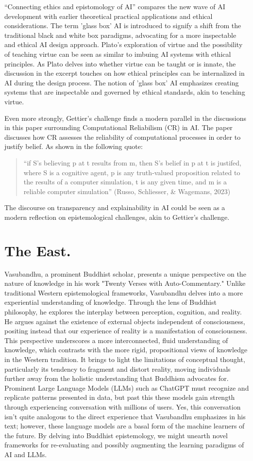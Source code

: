 \documentclass[
	a4paper, %
	10pt, %
	unnumberedsections, %
	twoside, %
]{LTJournalArticle}
\begin{document}
“Connecting ethics and epistomology of AI” compares the new wave of AI development with earlier theoretical practical applications and ethical considerations. The term 'glass box' AI is introduced to signify a shift from the traditional black and white box paradigms, advocating for a more inspectable and ethical AI design approach. Plato's exploration of virtue and the possibility of teaching virtue can be seen as similar to imbuing AI systems with ethical principles. As Plato delves into whether virtue can be taught or is innate, the discussion in the excerpt touches on how ethical principles can be internalized in AI during the design process. The notion of 'glass box' AI emphasizes creating systems that are inspectable and governed by ethical standards, akin to teaching virtue.

Even more strongly, Gettier’s challenge finds a modern parallel in the discussions in this paper surrounding Computational Reliabilism (CR) in AI. The paper discusses how CR assesses the reliability of computational processes in order to justify belief. As shown in the following quote:
\begin{quote}
	“if S's believing p at t results from m, then S's belief in p at t is justifed, where S is a cognitive 	agent, p is any truth‐valued proposition related to the results of a computer simulation, t is any 	given time, and m is a reliable computer simulation” (Russo, Schliesser, \& Wagemans, 2023)
\end{quote}
The discourse on transparency and explainability in AI could be seen as a modern reflection on epistemological challenges, akin to Gettier’s challenge.
\section{The East.}
Vasubandhu, a prominent Buddhist scholar, presents a unique perspective on the nature of knowledge in his work "Twenty Verses with Auto-Commentary." Unlike traditional Western epistemological frameworks, Vasubandhu delves into a more experiential understanding of knowledge. Through the lens of Buddhist philosophy, he explores the interplay between perception, cognition, and reality. He argues against the existence of external objects independent of consciousness, positing instead that our experience of reality is a manifestation of consciousness. This perspective underscores a more interconnected, fluid understanding of knowledge, which contrasts with the more rigid, propositional views of knowledge in the Western tradition. It brings to light the limitations of conceptual thought, particularly its tendency to fragment and distort reality, moving individuals further away from the holistic understanding that Buddhism advocates for.
Prominent Large Language Models (LLMs) such as ChatGPT must recognize and replicate patterns presented in data, but past this these models gain strength through experiencing conversation with millions of users. Yes, this conversation isn’t quite analogous to the direct experience that Vasubandhu emphasizes in his text; however, these language models are a basal form of the machine learners of the future. By delving into Buddhist epistemology, we might unearth novel frameworks for re-evaluating and possibly augmenting the learning paradigms of AI and LLMs. 
\end{document}
